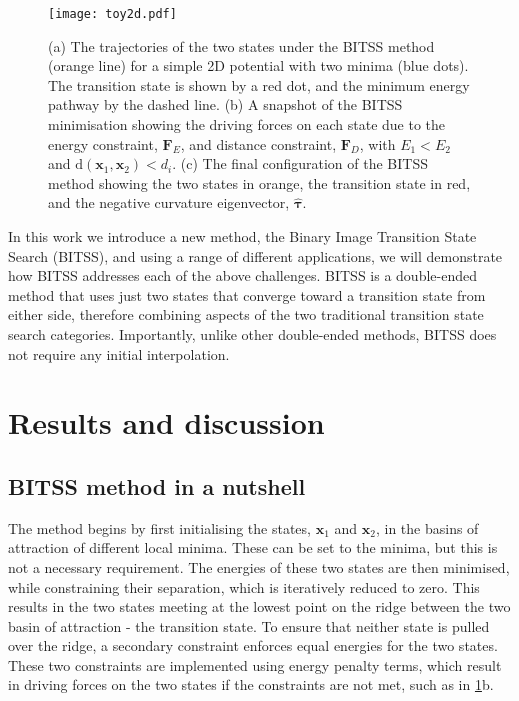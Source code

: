 \documentclass[twocolumn,10pt]{revtex4-2}
\begin{document}
\begin{figure}[htb]
  \texttt{[image: toy2d.pdf]}
  \caption{\label{fig:toy2d}
    (a) The trajectories of the two states under the BITSS method (orange line) for a simple 2D potential with two minima (blue dots).
        The transition state is shown by a red dot, and the minimum energy pathway by the dashed line.
    (b) A snapshot of the BITSS minimisation showing the driving forces on each state due to the energy constraint, $\bm{F}_E$, and distance constraint, $\bm{F}_D$, with $E_1 < E_2$ and $\mathrm{d}(\bm{x}_1,\bm{x}_2) < d_i$.
    (c) The final configuration of the BITSS method showing the two states in orange, the transition state in red, and the negative curvature eigenvector, $\bm{\hat{\tau}}$.
  }
\end{figure}

In this work we introduce a new method, the Binary Image Transition State Search (BITSS), and using a range of different applications, we will demonstrate how BITSS addresses each of the above challenges.
BITSS is a double-ended method that uses just two states that converge toward a transition state from either side, therefore combining aspects of the two traditional transition state search categories.
Importantly, unlike other double-ended methods, BITSS does not require any initial interpolation.


\section{Results and discussion}
\subsection{BITSS method in a nutshell}
The method begins by first initialising the states, $\bm{x}_1$ and $\bm{x}_2$, in the basins of attraction of different local minima.
These can be set to the minima, but this is not a necessary requirement.
The energies of these two states are then minimised, while constraining their separation, which is iteratively reduced to zero.
This results in the two states meeting at the lowest point on the ridge between the two basin of attraction - the transition state.
To ensure that neither state is pulled over the ridge, a secondary constraint enforces equal energies for the two states.
These two constraints are implemented using energy penalty terms, which result in driving forces on the two states if the constraints are not met, such as in \cref{fig:toy2d}b.
\end{document}
